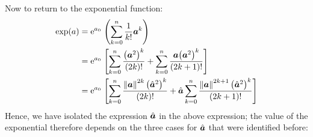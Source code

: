 Now to return to the exponential function:
\begin{equation}
    \begin{split}
        \exp(a) &= \ec^{a_0}\;\qty(\sum_{k=0}^n \frac{1}{k!} \vec{a}^k) \\
                &= \ec^{a_0}\;\qty[\sum_{k=0}^n \frac{\qty(\vec{a}^2)^k}{(2k)!}  + \sum_{k=0}^n \frac{\vec{a}\qty(\vec{a}^2)^k}{(2k+1)!}] \\
                &= \ec^{a_0}\;\qty[\sum_{k=0}^n \frac{\norm{\vec{a}}^{2k}\, \qty(\uvec{a}^2)^k}{(2k)!}  + \uvec{a}\sum_{k=0}^n \frac{\norm{\vec{a}}^{2k + 1} \, \qty(\uvec{a}^2)^k}{(2k+1)!}] \\
    \end{split}
\end{equation}
Hence, we have isolated the expression $\uvec{a}$ in the above expression; the value of the exponential therefore depends on the three cases for $\uvec{a}$ that were identified before:
